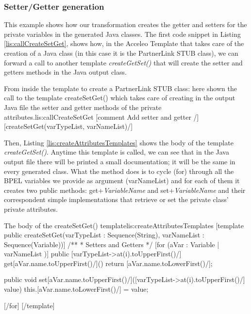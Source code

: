 \subsubsection{Setter/Getter generation}
\label{sec:setterGetter}
This example shows how our transformation creates the getter and setters for the private variables in the generated Java classes.
The first code snippet in Listing \ref{lis:callCreateSetGet}, shows how, in the Acceleo Template that takes care of the creation of a Java class (in this case it is the PartnerLink STUB class), we can forward a call to another template \textit{createGetSet()} that will create the setter and getters methods in the Java output class. 
\begin{center}
  \begin{minipage}{1\textwidth}
    \begin{java-code}{From inside the template to create a PartnerLink STUB class: here shown the call to the template createSetGet() which takes care of creating in the output Java file the setter and getter methods of the private attributes.}{lis:callCreateSetGet}
[comment Add setter and getter /]
[createSetGet(varTypeList, varNameList)/]	
    \end{java-code}
  \end{minipage}
\end{center}

Then, Listing \ref{lis:createAttributesTemplates} shows the body of the template \textit{createGetSet()}. Anytime this template is called, we can see that in the Java output file there will be printed a small documentation; it will be the same in every generated class. What the method does is to cycle (for) through all the BPEL variables we provide as argument (varNameList) and for each of them it creates two public methods: get+\textit{VariableName} and set+\textit{VariableName} and their correspondent simple implementations that retrieve or set the private class' private attributes.

\begin{center}
\begin{minipage}{1\textwidth}
  \begin{java-code}{The body of the createSetGet() template}{lis:createAttributesTemplates}
[template public createSetGet(varTypeList : Sequence(String), varNameList : Sequence(Variable))]
    /**
     * Setters and Getters    
     */
[for (aVar : Variable | varNameList )]
public [varTypeList->at(i).toUpperFirst()/] get[aVar.name.toUpperFirst()/]() {
	return [aVar.name.toLowerFirst()/];
}

public void set[aVar.name.toUpperFirst()/]([varTypeList->at(i).toUpperFirst()/] value) {  
	this.[aVar.name.toLowerFirst()/] = value;
}

[/for]
[/template]	
    \end{java-code}
  \end{minipage}
\end{center}

